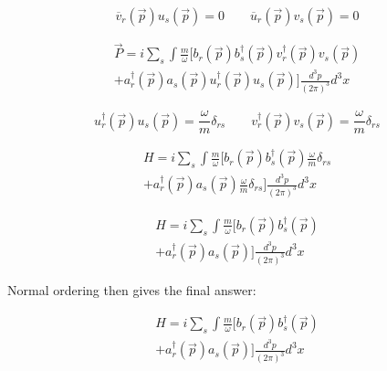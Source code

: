 \documentclass[a4]{article}
\begin{document}
    \begin{equation}
        \overline{v}_r (\vec{p}) u_s (\vec{p}) = 0 \qquad \overline{u}_r (\vec{p}) v_s (\vec{p}) = 0
    \end{equation}

    \begin{equation}
        \begin{aligned}
            \vec{P} = i \sum_{s} \int \frac{m}{\omega} [b_r (\vec{p}) b_s^{\dagger} (\vec{p}) v_r^{\dagger} (\vec{p}) v_s (\vec{p}) \\
        + a_r^{\dagger} (\vec{p}) a_s (\vec{p}) u_r^{\dagger} (\vec{p}) u_s (\vec{p})] \frac{d^{3} p}{(2 \pi)^3} d^3 x
        \end{aligned}
    \end{equation}

    \begin{equation}
        u_r^{\dagger} (\vec{p}) u_s (\vec{p}) = \frac{\omega}{m} \delta_{rs} \qquad v_r^{\dagger} (\vec{p}) v_s (\vec{p}) = \frac{\omega}{m} \delta_{rs}
    \end{equation}

    \begin{equation}
        \begin{aligned}
            H = i \sum_{s} \int \frac{m}{\omega} [b_r (\vec{p}) b_s^{\dagger} (\vec{p}) \frac{\omega}{m} \delta_{rs} \\
        + a_r^{\dagger} (\vec{p}) a_s (\vec{p}) \frac{\omega}{m} \delta_{rs}] \frac{d^{3} p}{(2 \pi)^3} d^3 x
        \end{aligned}
    \end{equation}

    \begin{equation}
        \begin{aligned}
            H = i \sum_{s} \int \frac{m}{\omega} [b_r (\vec{p}) b_s^{\dagger} (\vec{p}) \\
        + a_r^{\dagger} (\vec{p}) a_s (\vec{p})] \frac{d^{3} p}{(2 \pi)^3} d^3 x
        \end{aligned}
    \end{equation}

    Normal ordering then gives the final answer:

    \begin{framed}
        \begin{equation}
            \begin{aligned}
                H = i \sum_{s} \int \frac{m}{\omega} [b_r (\vec{p}) b_s^{\dagger} (\vec{p}) \\
            + a_r^{\dagger} (\vec{p}) a_s (\vec{p})] \frac{d^{3} p}{(2 \pi)^3} d^3 x
            \end{aligned}
        \end{equation}
    \end{framed}
\end{document}
